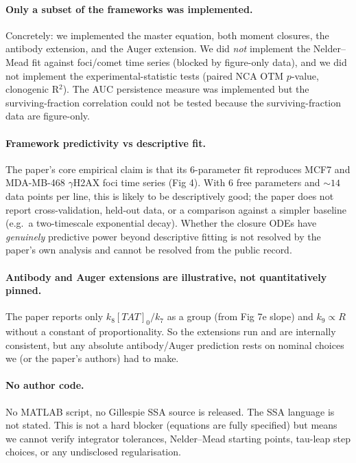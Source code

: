 \documentclass[11pt]{article}
\begin{document}
\paragraph{Only a subset of the frameworks was implemented.} Concretely: we implemented the
master equation, both moment closures, the antibody extension, and the Auger extension. We did
\emph{not} implement the Nelder--Mead fit against foci/comet time series (blocked by
figure-only data), and we did not implement the experimental-statistic tests (paired NCA OTM
$p$-value, clonogenic R$^2$). The AUC persistence measure was implemented but the surviving-fraction
correlation could not be tested because the surviving-fraction data are figure-only.

\paragraph{Framework predictivity vs descriptive fit.} The paper's core empirical claim is that
its 6-parameter fit reproduces MCF7 and MDA-MB-468 $\gamma$H2AX foci time series (Fig 4). With 6
free parameters and $\sim 14$ data points per line, this is likely to be descriptively good; the
paper does not report cross-validation, held-out data, or a comparison against a simpler baseline
(e.g.\ a two-timescale exponential decay). Whether the closure ODEs have \emph{genuinely}
predictive power beyond descriptive fitting is not resolved by the paper's own analysis and cannot
be resolved from the public record.

\paragraph{Antibody and Auger extensions are illustrative, not quantitatively pinned.} The paper
reports only $k_8[TAT]_0/k_7$ as a group (from Fig 7e slope) and $k_9 \propto R$ without a constant
of proportionality. So the extensions run and are internally consistent, but any absolute
antibody/Auger prediction rests on nominal choices we (or the paper's authors) had to make.

\paragraph{No author code.} No MATLAB script, no Gillespie SSA source is released. The SSA
language is not stated. This is not a hard blocker (equations are fully specified) but means we
cannot verify integrator tolerances, Nelder--Mead starting points, tau-leap step choices, or any
undisclosed regularisation.
\end{document}
